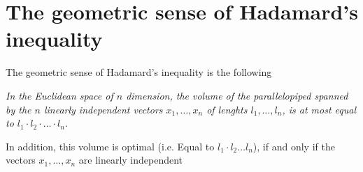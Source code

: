 \section{The geometric sense of Hadamard's inequality}
The geometric sense of Hadamard's inequality is the following 

\begin{center}
	\it 
	In the Euclidean space of $n $ dimension, the volume of 
	the parallelopiped spanned by the $n $ linearly independent 
	vectors $x_1 , \hdots , x_{n}$ of 
	lenghts $  l_1, \hdots , l _n  $, is at most 
	equal to $l_1 \cdot  l_2 \cdot  \hdots  \cdot  l_n  $.
	\normalfont
\end{center}

In addition, this volume is optimal 
(i.e. Equal to $l_1 \cdot  l_2 \hdots  l_n  $), if and only if
the vectors $x_1 , \hdots , x_n  $ are linearly independent 
\begin{center}
\end{center}
